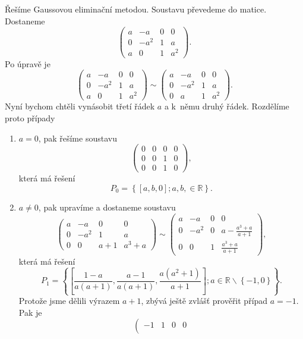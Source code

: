 \begin{reseni}
Řešíme Gaussovou eliminační metodou. Soustavu převedeme do matice. Dostaneme
$$
\left(\begin{array}{ccc|c}
		a &-a&0&0\\
		0&-a^2 & 1& a\\
		a & 0 & 1 & a^2
	\end{array}\right).
$$
Po úpravě je
$$
\left(\begin{array}{ccc|c}
		a &-a&0&0\\
		0&-a^2 & 1& a\\
		a & 0 & 1 & a^2
	\end{array}\right) \sim \left(\begin{array}{ccc|c}
			a &-a&0&0\\
			0&-a^2 & 1& a\\
			0 & a & 1 & a^2
		\end{array}\right).
$$
Nyní bychom chtěli vynásobit třetí řádek $a$ a k~němu druhý řádek. Rozdělíme proto případy
\begin{enumerate}[$i.$]
	\item $a = 0$, pak řešíme soustavu
	$$
 \left(\begin{array}{ccc|c}
			0 &0&0&0\\
			0&0 & 1& 0\\
			0 & 0 & 1 & 0
		\end{array}\right),
	$$
	která má řešení
	$$
	    P_0 = \left \{ \left [ a,b,0 \right ]; a,b, \in \mathbb R \right \}.
	$$
	\item $a \ne 0$, pak upravíme a dostaneme soustavu
	$$
 \left(\begin{array}{ccc|c}
			a &-a&0&0\\
			0&-a^2 & 1& a\\
			0 & 0 & a+1 & a^3 + a
		\end{array}\right) \sim \left(\begin{array}{ccc|c}
				a &-a&0&0\\
				0&-a^2 & 0& a - \frac{a^3 + a}{a+1} \\
				0 & 0 & 1 & \frac{a^3 + a}{a+1}
			\end{array}\right),
	$$
	která má řešení
	$$
	    P_1 = \left \{ \left [ \frac{1-a}{a(a+1)}, \frac{a-1}{a(a+1)}, \frac{a(a^2+1)}{a+1} \right ]; a \in \mathbb R \smallsetminus \left \{ -1, 0 \right \}   \right \} .
	$$
	Protože jsme dělili výrazem $a+1$, zbývá ještě zvlášť prověřit případ $a=-1$. Pak je
	$$
 \left(\begin{array}{ccc|c}
			-1 &1&0&0\\

\end{array}$$
\end{enumerate}
\end{reseni}

